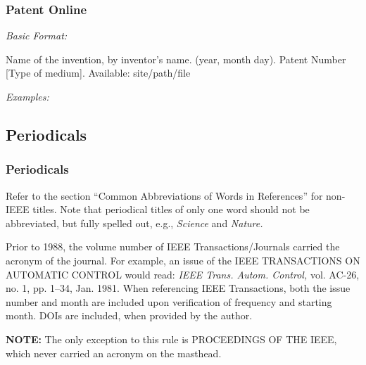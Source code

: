 \documentclass[10pt]{article}
\newcommand*{\guidelabel}[1]{\par\vspace{-4pt}\hspace*{22pt}\textit{#1}\par\vspace{-\parskip}}
\begin{document}
\subsubsection{Patent Online}
\guidelabel{Basic Format:}
\begin{guideitems}
  \item Name of the invention, by inventor’s name. (year, month day). Patent Number [Type of medium]. Available: site/path/file
\end{guideitems}
\guidelabel{Examples:}
\begin{guideitems}
  \item {}
  \item {}
\end{guideitems}

\subsection{Periodicals}

\subsubsection{Periodicals}

Refer to the section “Common Abbreviations of Words in References” for non-IEEE titles. Note that periodical titles of only one word should not be abbreviated, but fully spelled out, e.g., \textit{Science} and \textit{Nature.}

Prior to 1988, the volume number of IEEE Transactions/Journals carried the acronym of the journal. For example, an issue of the IEEE TRANSACTIONS ON AUTOMATIC CONTROL would read: \textit{IEEE Trans. Autom. Control,} vol. AC-26, no. 1, pp. 1–34, Jan. 1981. When referencing IEEE Transactions, both the issue number and month are included upon verification of frequency and starting month. DOIs are included, when provided by the author.

\textbf{NOTE:} The only exception to this rule is PROCEEDINGS OF THE IEEE, which never carried an acronym on the masthead.
\end{document}
